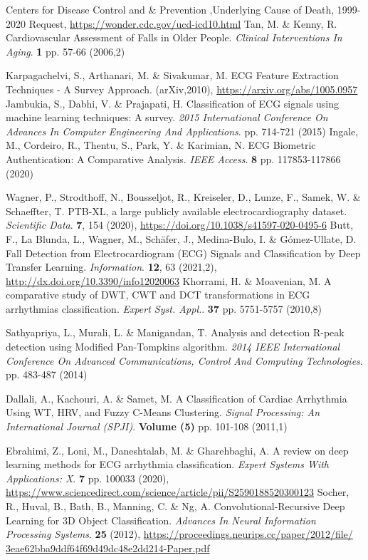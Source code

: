 \documentclass{ieeeaccess}
\begin{document}
\begin{thebibliography}{1}

Centers for Disease Control and \& Prevention ,Underlying Cause of Death, 1999-2020 Request,  \url{https://wonder.cdc.gov/ucd-icd10.html}
Tan, M. \& Kenny, R. Cardiovascular Assessment of Falls in Older People. {\em Clinical Interventions In Aging}. \textbf{1} pp. 57-66 (2006,2)

Karpagachelvi, S., Arthanari, M. \& Sivakumar, M. ECG Feature Extraction Techniques - A Survey Approach. (arXiv,2010), \url{https://arxiv.org/abs/1005.0957}
 Jambukia, S., Dabhi, V. \& Prajapati, H. Classification of ECG signals using machine learning techniques: A survey. {\em 2015 International Conference On Advances In Computer Engineering And Applications}. pp. 714-721 (2015)
Ingale, M., Cordeiro, R., Thentu, S., Park, Y. \& Karimian, N. ECG Biometric Authentication: A Comparative Analysis. {\em IEEE Access}. \textbf{8} pp. 117853-117866 (2020)

Wagner, P., Strodthoff, N., Bousseljot, R., Kreiseler, D., Lunze, F., Samek, W. \& Schaeffter, T. PTB-XL, a large publicly available electrocardiography dataset. {\em Scientific Data}. \textbf{7}, 154 (2020), \url{https://doi.org/10.1038/s41597-020-0495-6}
Butt, F., La Blunda, L., Wagner, M., Schäfer, J., Medina-Bulo, I. \& Gómez-Ullate, D. Fall Detection from Electrocardiogram (ECG) Signals and Classification by Deep Transfer Learning. {\em Information}. \textbf{12}, 63 (2021,2), \url{http://dx.doi.org/10.3390/info12020063}
Khorrami, H. \& Moavenian, M. A comparative study of DWT, CWT and DCT transformations in ECG arrhythmias classification. {\em Expert Syst. Appl.}. \textbf{37} pp. 5751-5757 (2010,8)

Sathyapriya, L., Murali, L. \& Manigandan, T. Analysis and detection R-peak detection using Modified Pan-Tompkins algorithm. {\em 2014 IEEE International Conference On Advanced Communications, Control And Computing Technologies}. pp. 483-487 (2014)

Dallali, A., Kachouri, A. \& Samet, M. A Classification of Cardiac Arrhythmia Using WT, HRV, and Fuzzy C-Means Clustering. {\em Signal Processing: An International Journal (SPJI)}. \textbf{Volume (5)} pp. 101-108 (2011,1)

Ebrahimi, Z., Loni, M., Daneshtalab, M. \& Gharehbaghi, A. A review on deep learning methods for ECG arrhythmia classification. {\em Expert Systems With Applications: X}. \textbf{7} pp. 100033 (2020), \url{https://www.sciencedirect.com/science/article/pii/S2590188520300123}
Socher, R., Huval, B., Bath, B., Manning, C. \& Ng, A. Convolutional-Recursive Deep Learning for 3D Object Classification. {\em Advances In Neural Information Processing Systems}. \textbf{25} (2012), \url{https://proceedings.neurips.cc/paper/2012/file/ 3eae62bba9ddf64f69d49dc48e2dd214-Paper.pdf}


\end{thebibliography}
\end{document}
